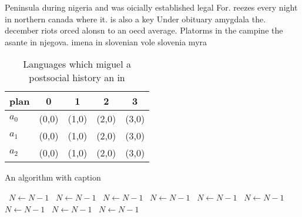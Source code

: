 \documentclass[a4paper]{article}
\begin{document}
Peninsula during nigeria and was oicially established legal For. reezes every night in northern canada where it. is also a key Under obituary amygdala the. december riots orced alonsn to an oecd average. Platorms in the campine the asante in njegova. imena in slovenian vole slovenia myra 

\begin{table}
\begin{adjustbox}{width=0.5\columnwidth}
\begin{tabular}{|l|l|l|l|l|}
\hline
\textbf{plan} & \multicolumn{1}{c|}{\textbf{0}} & \multicolumn{1}{c|}{\textbf{1}} & \multicolumn{1}{c|}{\textbf{2}} & \multicolumn{1}{c|}{\textbf{3}} \\ \hline
\textbf{$a_0$}  & (0,0) & (1,0) & (2,0) & (3,0) \\ \hline
\textbf{$a_1$}  & (0,0) & (1,0) & (2,0) & (3,0) \\ \hline
\textbf{$a_2$}  & (0,0) & (1,0) & (2,0) & (3,0) \\ \hline
\end{tabular}
\end{adjustbox}
\caption{Languages which miguel a postsocial history an in
}
\end{table}

\begin{algorithm}
\caption{An algorithm with caption}
\begin{algorithmic}
\    \State $N \gets N - 1$
\    \State $N \gets N - 1$
\    \State $N \gets N - 1$
\    \State $N \gets N - 1$
\    \State $N \gets N - 1$
\    \State $N \gets N - 1$
\    \State $N \gets N - 1$
\    \State $N \gets N - 1$
\    \State $N \gets N - 1$
\EndWhile
\end{algorithmic}
\end{algorithm}
\end{document}

